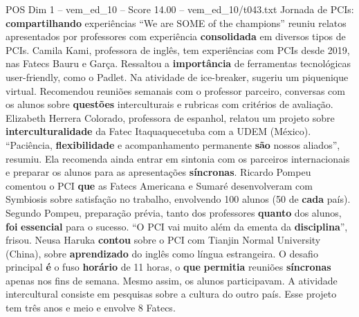 \begin{textsample}{POS Dim 1 – vem\_ed\_10 – Score 14.00 – vem\_ed\_10/t043.txt}  \label{ex:f1_pos_119}
Jornada de PCIs: \textbf{compartilhando} experiências “We are SOME of the champions” reuniu relatos apresentados por professores com experiência \textbf{consolidada} em diversos tipos de PCIs.
Camila Kami, professora de inglês, tem experiências com PCIs desde 2019, nas Fatecs Bauru e Garça.
Ressaltou a \textbf{importância} de ferramentas tecnológicas user-friendly, como o Padlet.
Na atividade de ice-breaker, sugeriu um piquenique virtual.
Recomendou reuniões semanais com o professor parceiro, conversas com os alunos sobre \textbf{questões} interculturais e rubricas com critérios de avaliação.
Elizabeth Herrera Colorado, professora de espanhol, relatou um projeto sobre \textbf{interculturalidade} da Fatec Itaquaquecetuba com a UDEM (México). “Paciência, \textbf{flexibilidade} e acompanhamento permanente \textbf{são} nossos aliados”, resumiu.
Ela recomenda ainda entrar em sintonia com os parceiros internacionais e preparar os alunos para as apresentações \textbf{síncronas}.
Ricardo Pompeu comentou o PCI \textbf{que} as Fatecs Americana e Sumaré desenvolveram com Symbiosis sobre satisfação no trabalho, envolvendo 100 alunos (50 de \textbf{cada} país).
Segundo Pompeu, preparação prévia, tanto dos professores \textbf{quanto} dos alunos, \textbf{foi} \textbf{essencial} para o sucesso. “O PCI vai muito além da ementa da \textbf{disciplina}”, frisou.
Neusa Haruka \textbf{contou} sobre o PCI com Tianjin Normal University (China), sobre \textbf{aprendizado} do inglês como língua estrangeira.
O desafio principal \textbf{é} o fuso \textbf{horário} de 11 horas, o \textbf{que} \textbf{permitia} reuniões \textbf{síncronas} apenas nos fins de semana.
Mesmo assim, os alunos participavam.
A atividade intercultural consiste em pesquisas sobre a cultura do outro país.
Esse projeto tem três anos e meio e envolve 8 Fatecs.

\end{textsample}
